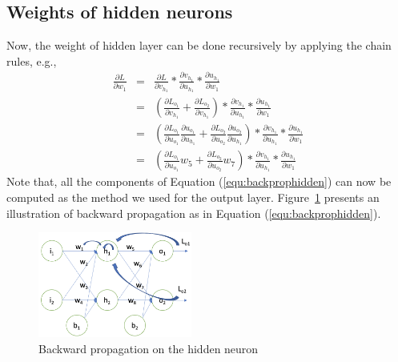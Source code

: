 \subsection*{Weights of hidden neurons}

Now, the weight of hidden layer can be done recursively by applying the chain rules, e.g., 
\begin{equation}\label{equ:backprophidden}
\begin{array}{rcl}
   \displaystyle  \frac{{\partial L}}{{\partial w_1}} 
   &  = & \displaystyle \frac{{\partial L}}{{\partial v_{h_1}}}*\frac{{\partial v_{h_1}}}{{\partial u_{h_1}}}*\frac{{\partial u_{h_1}}}{{\partial w_1}} \\ 
    & = & \displaystyle (\frac{{\partial L_{o_1}}}{{\partial v_{h_1}}}+\frac{{\partial L_{o_2}}}{{\partial v_{h_1}}})*\frac{{\partial v_{h_1}}}{{\partial u_{h_1}}}*\frac{{\partial u_{h_1}}}{{\partial w_1}} \\
    & = & \displaystyle (\frac{{\partial L_{o_1}}}{{\partial u_{o_1}}}\frac{{\partial u_{o_1}}}{{\partial u_{h_1}}}+\frac{{\partial L_{o_2}}}{{\partial u_{o_2}}}\frac{{\partial u_{o_2}}}{{\partial u_{h_1}}})*\frac{{\partial v_{h_1}}}{{\partial u_{h_1}}}*\frac{{\partial u_{h_1}}}{{\partial w_1}}\\
    & = & \displaystyle (\frac{{\partial L_{o_1}}}{{\partial u_{o_1}}}w_5+\frac{{\partial L_{o_2}}}{{\partial u_{o_2}}}w_7)*\frac{{\partial v_{h_1}}}{{\partial u_{h_1}}}*\frac{{\partial u_{h_1}}}{{\partial w_1}}
\end{array}
\end{equation}
Note that, all the components of Equation (\ref{equ:backprophidden}) can now be computed as the method we used for the output layer. Figure~\ref{fig:backhidden} presents an illustration of backward propagation as in Equation (\ref{equ:backprophidden}). 

\begin{figure}[!htbp]
    \centering
    \includegraphics[width=0.45\textwidth]{images/deepLearning/propagation/back2.png}
    \caption{Backward propagation on the hidden neuron}
    \label{fig:backhidden}
\end{figure}

